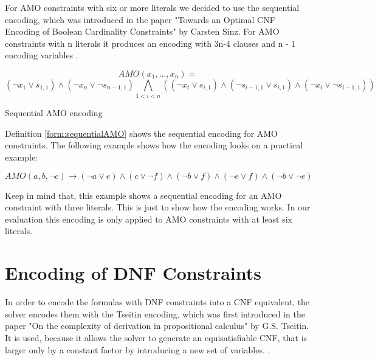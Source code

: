 For AMO constraints with six or more literals we decided to use the sequential encoding, which was introduced in the paper "Towards an Optimal CNF Encoding of
Boolean Cardinality Constraints" \cite{sinz2005towards} by Carsten Sinz. For AMO constraints with n literals it produces an encoding with 3n-4 clauses and n - 1 encoding variables \cite{sinz2005towards}.

\begin{definition}[!htb]
\centering
\begin{leftbar}
\begin{displaymath}
AMO(x_1,...,x_n) =
\end{displaymath}
\begin{displaymath}
(\neg x_1 \vee s_{1,1}) \wedge (\neg x_n \vee \neg s_{n-1,1}) \bigwedge_{1 < i < n} ((\neg x_i \vee s_{i,1}) \wedge (\neg s_{i-1,1} \vee s_{i,1}) \wedge (\neg x_i \vee \neg s_{i-1,1}))
\end{displaymath}
\end{leftbar}
\caption{Sequential AMO encoding \cite{sinz2005towards}}
\label{form:sequentialAMO}
\end{definition}

Definition \ref{form:sequentialAMO} shows the sequential encoding for AMO constraints. The following example shows how the encoding looks on a practical example:

\begin{leftbar}
\begin{displaymath}
AMO(a,b,\neg c) \rightarrow (\neg a \vee e) \wedge (c \vee \neg f) \wedge (\neg b \vee f) \wedge (\neg e \vee f) \wedge (\neg b \vee \neg e)
\end{displaymath}
\end{leftbar}

Keep in mind that, this example shows a sequential encoding for an AMO constraint with three literals. This is just to show how the encoding works. In our evaluation this encoding is only applied to AMO constraints with at least six literals.

\section{Encoding of DNF Constraints}

In order to encode the formulas with DNF constraints into a CNF equivalent, the solver encodes them with the Tseitin encoding, which was first introduced in the paper "On the complexity of derivation in propositional calculus" \cite{tseitin1983complexity} by G.S. Tseitin. It is used, because it allows the solver to generate an equisatisfiable CNF, that is larger only by a constant factor by introducing a new set of variables. \cite{biere2009handbook}.

